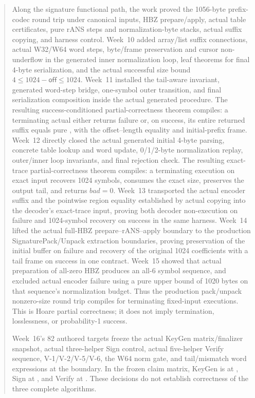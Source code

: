 \documentclass[11pt,a4paper]{article}
\begin{document}
\begin{abstract}
Along the signature functional path, the work proved the 1056-byte prefix-codec
round trip under canonical inputs, HBZ prepare/apply, actual table certificates,
pure rANS steps and normalization-byte stacks, actual suffix copying, and
harness control. Week~10 added array/list suffix connections, actual W32/W64
word steps, byte/frame preservation and cursor non-underflow in the generated
inner normalization loop, leaf theorems for final 4-byte serialization, and
the actual  successful size bound
\(4\le 1024-\mathsf{off}\le1024\). Week~11 installed the tail-aware invariant,
generated word-step bridge, one-symbol outer transition, and final
serialization composition inside the actual generated procedure. The resulting
success-conditioned partial-correctness theorem compiles: a terminating actual
 either returns failure or, on success, its entire
returned suffix equals pure , with the offset--length
equality and initial-prefix frame. Week~12 directly closed the actual generated
 initial 4-byte parsing, concrete table lookup and word
update, 0/1/2-byte normalization replay, outer/inner loop invariants, and final
rejection check. The resulting exact-trace partial-correctness theorem compiles:
a terminating execution on exact  input recovers
1024 symbols, consumes the exact size, preserves the output tail, and returns
\(bad=0\). Week~13 transported the actual encoder suffix and the pointwise
region equality established by actual copying into the decoder's exact-trace
input, proving both decoder non-execution on failure and 1024-symbol recovery
on success in the same harness. Week~14 lifted the actual full-HBZ
prepare--rANS--apply boundary to the production SignaturePack/Unpack extraction
boundaries, proving preservation of the initial buffer on failure and recovery
of the original 1024 coefficients with a tail frame on success in one contract.
Week~15 showed that actual preparation of all-zero HBZ produces an all-6 symbol
sequence, and excluded actual encoder failure using a pure upper bound of
1020 bytes on that sequence's normalization budget. Thus the production
pack/unpack nonzero-size round trip compiles for terminating fixed-input
executions. This is Hoare partial correctness; it does not imply termination,
losslessness, or probability-1 success.

Week~16's 82 authored targets freeze the actual KeyGen matrix/finalizer
snapshot, actual three-helper Sign control, actual five-helper Verify sequence,
V-1/V-2/V-5/V-6, the W64 norm gate, and tail/mismatch word expressions at the
 boundary. In the frozen claim matrix, KeyGen is at
, Sign at , and Verify
at . These decisions do not establish
correctness of the three complete algorithms.


\end{abstract}
\end{document}
